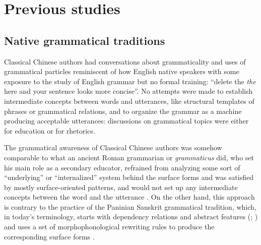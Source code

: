\documentclass[UTF8, a4paper, oneside, scheme=plain, 12pt]{ctexrep}
\newcommand*{\citepages}[1]{pp.~{#1}}
\newcommand{\form}[1]{\emph{#1}}
\begin{document}
\section{Previous studies}

\subsection{Native grammatical traditions}\label{sec:introduction.previous.tradition}

Classical Chinese authors had conversations about grammaticality 
and uses of grammatical particles
reminiscent of how English native speakers
with some exposure to the study of English grammar but no formal training:
``delete the \form{the} here and your sentence looks more concise''.
No attempts were made to establish intermediate concepts between words and utterances,
like structural templates of phrases or grammatical relations, 
and to organize the grammar as a machine producing acceptable utterances:
discussions on grammatical topics were either for education or for rhetorics.

The grammatical awareness of Classical Chinese authors was somehow comparable to 
what an ancient Roman grammarian or \form{grammaticus} did,
who set his main role as a secondary educator,
refrained from analyzing some sort of ``underlying'' or ``internalized'' system behind the surface forms
and was satisfied by mostly surface-oriented patterns,
and would not set up any intermediate concepts between the word and the utterance
\citep[\citepages{7,35,47-48}]{matthews2019graeco}.
On the other hand, this approach is contrary to the practice
of the Paninian Sanskrit grammatical tradition,
which, in today's terminology, starts with dependency relations  and abstract features (; )
and uses a set of morphophonological rewriting rules to produce the corresponding surface forms
\citep{kiparsky2009architecture}.
\end{document}
